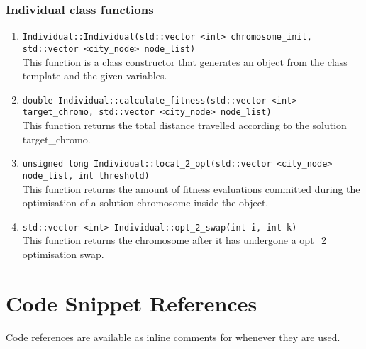 \documentclass[12pt]{article}
\begin{document}
\subsubsection{Individual class functions}

\begin{enumerate}
	\item \texttt{Individual::Individual(std::vector <int> chromosome\_init, std::vector <city\_node> node\_list)}\\
	This function is a class constructor that generates an object from the class template and the given variables.
	
	\item \texttt{double Individual::calculate\_fitness(std::vector <int> target\_chromo, std::vector <city\_node> node\_list)}\\
	This function returns the total distance travelled according to the solution target\_chromo.
	
	\item \texttt{unsigned long Individual::local\_2\_opt(std::vector <city\_node> node\_list, int threshold)}\\
	This function returns the amount of fitness evaluations committed during the optimisation of a solution chromosome inside the object.
	
	\item \texttt{std::vector <int> Individual::opt\_2\_swap(int i, int k)}\\
	This function returns the chromosome after it has undergone a opt\_2 optimisation swap.
	
\end{enumerate}

\section{Code Snippet References}
Code references are available as inline comments for whenever they are used.
\end{document}
